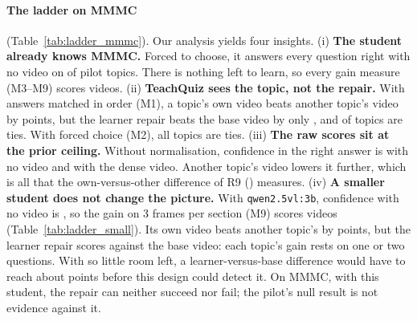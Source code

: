 \paragraph{The ladder on MMMC} (Table~\ref{tab:ladder_mmmc}). Our analysis yields four insights.
(i) \textbf{The student already knows MMMC.} Forced to choose, it answers every question right with no video on
\LadMMMCBlindAllRight{} of \LadMMMCTopics{} pilot topics. There is nothing left to learn, so every gain measure
(M3--M9) scores \LadMMMCDefinedNVG{} videos.
(ii) \textbf{TeachQuiz sees the topic, not the repair.} With answers matched in order (M1), a topic's own video beats
another topic's video by \LadMMMCSepOne{} points, but the learner repair beats the base video by only
\LadMMMCLBOne{}, and \LadMMMCTiesOne{} of \LadMMMCTopics{} topics are ties. With forced choice (M2), all
\LadMMMCTiesTwo{} topics are ties.
(iii) \textbf{The raw scores sit at the prior ceiling.} Without normalisation, confidence in the right answer is
\LadMMMCSBlind{} with no video and \LadMMMCSVisual{} with the dense video. Another topic's video lowers it further,
which is all that the own-versus-other difference of R9 (\LadMMMCSepRawNine{}) measures.
(iv) \textbf{A smaller student does not change the picture.} With \texttt{qwen2.5vl:3b}, confidence with no video is
\LadSmallSBlind{}, so the gain on 3 frames per section (M9) scores \LadSmallDefinedNine{} videos
(Table~\ref{tab:ladder_small}). Its own video beats another topic's by \LadSmallSepNine{} points, but the learner
repair scores \LadSmallLBNine{} against the base video: each topic's gain rests on one or two questions. With so
little room left, a learner-versus-base difference would have to reach about \NMSmallMDE{} points before this design
could detect it.
On MMMC, with this student, the repair can neither succeed nor fail; the pilot's null result is not evidence
against it.



